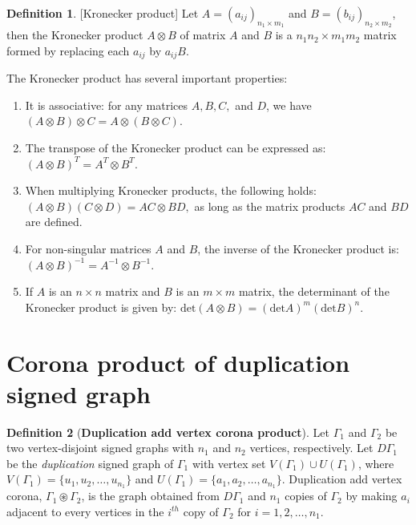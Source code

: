 \documentclass[12pt,a4paper]{article}
\theoremstyle{definition}
\newtheorem{definition}{Definition}[section]
\theoremstyle{remark}
\begin{document}
    \begin{definition}\cite{neumaier1992horn}[Kronecker product]
        Let $A=(a_{ij})_{n_1\times m_1}$ and $B=(b_{ij})_{n_2\times m_2}$, then the Kronecker product $A\otimes B$ of matrix $A$ and $B$ is a $n_1n_2\times m_1m_2$ matrix formed by replacing each $a_{ij}$ by $a_{ij}B$.
    \end{definition}
    The Kronecker product has several important properties:
    \begin{enumerate}
        \item It is associative: for any matrices \( A, B, C, \) and \( D \), we have \( (A \otimes B) \otimes C = A \otimes (B \otimes C) \).
        \item The transpose of the Kronecker product can be expressed as: 
        $(A \otimes B)^T = A^T \otimes B^T.$
        \item When multiplying Kronecker products, the following holds:
        $(A \otimes B)(C \otimes D) = AC \otimes BD,$ as long as the matrix products \( AC \) and \( BD \) are defined.
        \item For non-singular matrices \( A \) and \( B \), the inverse of the Kronecker product is:
        $(A \otimes B)^{-1} = A^{-1} \otimes B^{-1}.$
        \item If \( A \) is an \( n \times n \) matrix and \( B \) is an \( m \times m \) matrix, the determinant of the Kronecker product is given by:
        $\text{det}(A \otimes B) = (\text{det} A)^m (\text{det} B)^n.$
    \end{enumerate}

\section{Corona product of duplication signed graph}
    \begin{definition}[\textbf{Duplication add vertex corona product}]
        Let $\Gamma_1$ and $\Gamma_2$ be two vertex-disjoint signed graphs with $n_1$ and $n_2$ vertices, respectively. Let $D\Gamma_1$ be the \textit{duplication} signed graph of $\Gamma_1$ with vertex set $V(\Gamma_1)\cup U(\Gamma_1)$, where $V(\Gamma_1)=\{u_1,u_2,\ldots,u_{n_1}\}$ and $U(\Gamma_1)=\{a_1,a_2,\ldots,a_{n_1}\}$. Duplication add vertex corona, $\Gamma_1 \circledast \Gamma_2$, is the graph obtained from $D\Gamma_1$ and $n_1$ copies of $\Gamma_2$ by making $a_i$ adjacent to every vertices in the $i^{th}$ copy of $\Gamma_2$ for $i=1,2,\ldots,n_1.$
    \end{definition}
\end{document}
